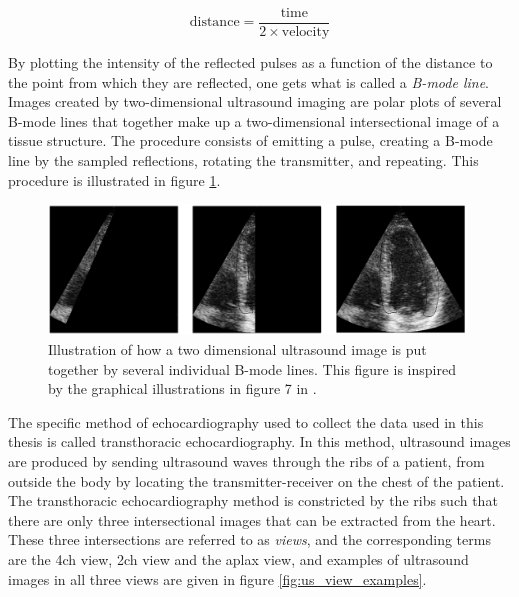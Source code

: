 \begin{equation}
    \mathrm{distance} = \frac{\mathrm{time}}{2 \times \mathrm{velocity}}
    \label{eq:dist}
\end{equation}

By plotting the intensity of the reflected pulses as a function of the distance to the point from which they are reflected, one gets what is called a \textit{B-mode line}. Images created by two-dimensional ultrasound imaging are polar plots of several B-mode lines that together make up a two-dimensional intersectional image of a tissue structure. The procedure consists of emitting a pulse, creating a B-mode line by the sampled reflections, rotating the transmitter, and repeating. This procedure is illustrated in figure \ref{fig:b_mode_search}.

\begin{figure}[H]
    \centering
    \includegraphics[width=0.99\textwidth]{echocardiography/b_mode_search.png}
    \caption{Illustration of how a two dimensional ultrasound image is put together by several individual B-mode lines. This figure is inspired by the graphical illustrations in figure 7 in \cite{basic_ultrasound}.}
    \label{fig:b_mode_search}
\end{figure}

The specific method of echocardiography used to collect the data used in this thesis is called transthoracic echocardiography. In this method, ultrasound images are produced by sending ultrasound waves through the ribs of a patient, from outside the body by locating the transmitter-receiver on the chest of the patient. The transthoracic echocardiography method is constricted by the ribs such that there are only three intersectional images that can be extracted from the heart. These three intersections are referred to as \textit{views}, and the corresponding terms are the \acrfull{4ch} view, \acrfull{2ch} view and the \acrfull{aplax} view, and examples of ultrasound images in all three views are given in figure \ref{fig:us_view_examples}.

